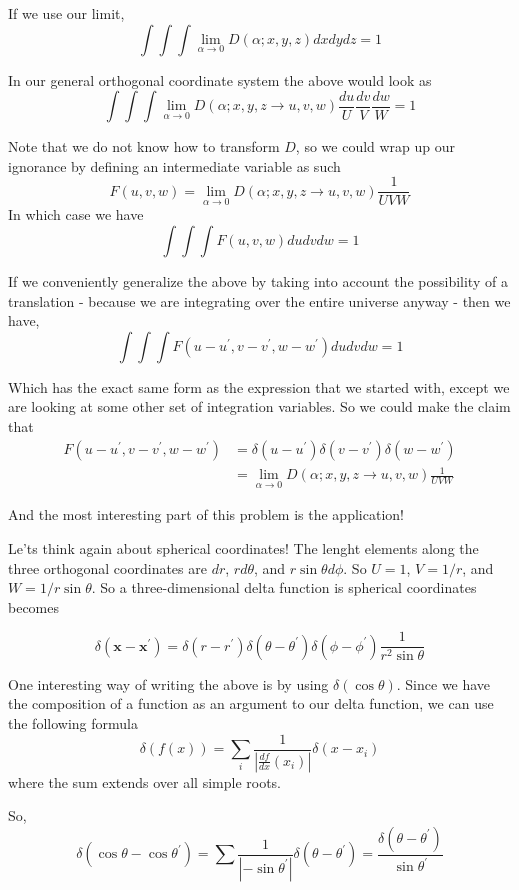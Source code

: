 If we use our limit,
$$
\int \int \int \lim_{\alpha\rightarrow 0} D(\alpha; x, y, z) dx dy dz = 1
$$

In our general orthogonal coordinate system the above would look as
$$
\int \int \int \lim_{\alpha\rightarrow 0} D(\alpha; x, y, z \rightarrow u, v, w) \frac{du}{U} \frac{dv}{V} \frac{dw}{W} = 1
$$

Note that we do not know how to transform $D$, so we could wrap up our ignorance by defining an intermediate variable as such
$$
F(u,v,w) = \lim_{\alpha\rightarrow 0} D(\alpha; x, y, z \rightarrow u, v, w) \frac{1}{UVW}
$$
In which case we have
$$
\int \int \int F(u,v,w) du dv dw = 1
$$

If we conveniently generalize the above by taking into account the possibility of a translation - because we are integrating over
the entire universe anyway - then we have,
$$
\int \int \int F(u-u^\prime, v-v^\prime, w-w^\prime) du dv dw = 1
$$

Which has the exact same form as the expression that we started with, except we are looking at some other set of integration variables.
So we could make the claim that
\begin{align*}
F(u-u^\prime, v-v^\prime, w-w^\prime) &= \delta(u-u^\prime) \delta(v-v^\prime) \delta(w-w^\prime) \\
&= \lim_{\alpha\rightarrow 0} D(\alpha; x, y, z \rightarrow u, v, w) \frac{1}{UVW}
\end{align*}


And the most interesting part of this problem is the application!

Le'ts think again about spherical coordinates!
The lenght elements along the three orthogonal coordinates are $dr$, $rd\theta$, and $r\sin\theta d\phi$.
So $U=1$, $V=1/r$, and $W=1/r\sin\theta$.
So a three-dimensional delta function is spherical coordinates becomes

$$
\delta\left(\mathbf{x}-\mathbf{x}^\prime\right) =
\delta(r-r^\prime) \delta(\theta-\theta^\prime) \delta(\phi-\phi^\prime) \frac{1}{r^2 \sin\theta}
$$

One interesting way of writing the above is by using $\delta(\cos\theta)$.
Since we have the composition of a function as an argument to our delta function, we can use the following formula
$$
\delta\left(f(x)\right) = \sum_i \frac{1}{\left|\frac{df}{dx} (x_i)\right|} \delta(x-x_i)
$$
where the sum extends over all simple roots.

So,
$$
\delta(\cos\theta - \cos\theta^\prime)
= \sum \frac{1}{\left|-\sin\theta^\prime \right|} \delta(\theta-\theta^\prime)
= \frac{\delta(\theta-\theta^\prime)}{\sin\theta^\prime}
$$

